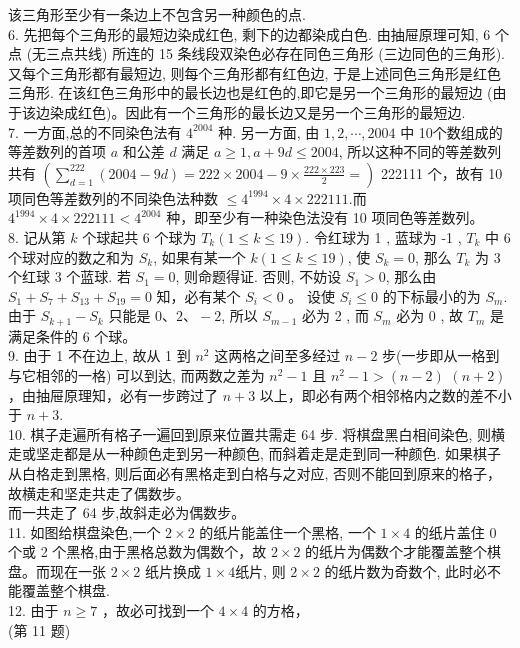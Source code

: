 \documentclass[10pt]{article}
\begin{document}
该三角形至少有一条边上不包含另一种颜色的点.\\
6. 先把每个三角形的最短边染成红色, 剩下的边都染成白色. 由抽屉原理可知, 6 个点 (无三点共线) 所连的 15 条线段双染色必存在同色三角形 (三边同色的三角形). 又每个三角形都有最短边, 则每个三角形都有红色边, 于是上述同色三角形是红色三角形. 在该红色三角形中的最长边也是红色的,即它是另一个三角形的最短边 (由于该边染成红色)。因此有一个三角形的最长边又是另一个三角形的最短边.\\
7. 一方面,总的不同染色法有 $4^{2004}$ 种. 另一方面, 由 $1,2, \cdots, 2004$ 中 10个数组成的等差数列的首项 $a$ 和公差 $d$ 满足 $a \geqslant 1, a+9 d \leqslant 2004$, 所以这种不同的等差数列共有 $\left(\sum_{d=1}^{222}(2004-9 d)=222 \times 2004-9 \times \frac{222 \times 223}{2}=\right)$ 222111 个，故有 10 项同色等差数列的不同染色法种数 $\leqslant 4^{1994} \times 4 \times 222111$.而 $4^{1994} \times 4 \times 222111<4^{2004}$ 种，即至少有一种染色法没有 10 项同色等差数列。\\
8. 记从第 $k$ 个球起共 6 个球为 $T_{k}(1 \leqslant k \leqslant 19)$. 令红球为 1 , 蓝球为 -1 , $T_{k}$ 中 6 个球对应的数之和为 $S_{k}$, 如果有某一个 $k(1 \leqslant k \leqslant 19)$, 使 $S_{k}=0$, 那么 $T_{k}$ 为 3 个红球 3 个蓝球. 若 $S_{1}=0$, 则命题得证. 否则, 不妨设 $S_{1}>0$, 那么由 $S_{1}+S_{7}+S_{13}+S_{19}=0$ 知，必有某个 $S_{i}<0$ 。 设使 $S_{i} \leqslant 0$ 的下标最小的为 $S_{m}$. 由于 $S_{k+1}-S_{k}$ 只能是 $0 、 2 、-2$, 所以 $S_{m-1}$ 必为 2 , 而 $S_{m}$ 必为 0 , 故 $T_{m}$ 是满足条件的 6 个球。\\
9. 由于 1 不在边上, 故从 1 到 $n^{2}$ 这两格之间至多经过 $n-2$ 步(一步即从一格到与它相邻的一格) 可以到达, 而两数之差为 $n^{2}-1$ 且 $n^{2}-1>(n-2)$ $(n+2)$ ，由抽屉原理知，必有一步跨过了 $n+3$ 以上，即必有两个相邻格内之数的差不小于 $n+3$.\\
10. 棋子走遍所有格子一遍回到原来位置共需走 64 步. 将棋盘黑白相间染色, 则横走或坚走都是从一种颜色走到另一种颜色, 而斜着走是走到同一种颜色. 如果棋子从白格走到黑格, 则后面必有黑格走到白格与之对应, 否则不能回到原来的格子，故横走和坚走共走了偶数步。\\
而一共走了 64 步,故斜走必为偶数步。\\
11. 如图给棋盘染色,一个 $2 \times 2$ 的纸片能盖住一个黑格, 一个 $1 \times 4$ 的纸片盖住 0 个或 2 个黑格,由于黑格总数为偶数个，故 $2 \times 2$ 的纸片为偶数个才能覆盖整个棋盘。而现在一张 $2 \times 2$ 纸片换成 $1 \times 4$纸片, 则 $2 \times 2$ 的纸片数为奇数个, 此时必不能覆盖整个棋盘.\\
12. 由于 $n \geqslant 7$ ，故必可找到一个 $4 \times 4$ 的方格，\\
(第 11 题)
\end{document}
